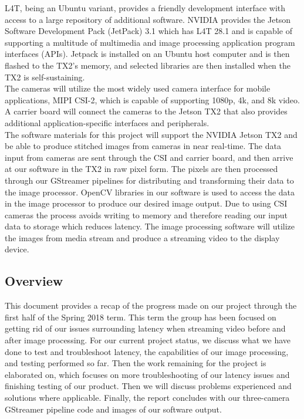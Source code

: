 \documentclass[letterpaper,10pt,serif,draftclsnofoot,onecolumn,compsoc,titlepage]{IEEEtran}
\begin{document}
L4T, being an Ubuntu variant, provides a friendly development interface with 
access to a large repository of additional software. NVIDIA provides the Jetson 
Software Development Pack (JetPack) 3.1 which has L4T 28.1 
and is capable of supporting a multitude of multimedia and image processing 
application program interfaces (APIs). Jetpack 
is installed on an Ubuntu host computer and is then flashed to the TX2's memory, and 
selected libraries are then installed when the TX2 is self-sustaining. \\

The cameras will utilize the most widely used camera interface for mobile applications, 
MIPI CSI-2, which is capable of supporting 1080p, 4k, and 8k video. 
A carrier board will connect the cameras to the Jetson TX2 that also provides 
additional application-specific interfaces and peripherals. \\

The software materials for this project will support the NVIDIA Jetson TX2 and 
be able to produce stitched images from cameras in near real-time. The data input 
from cameras are sent through the CSI and carrier board, and then arrive at our 
software in the TX2 in raw pixel form. The pixels are then processed through our 
GStreamer pipelines for distributing and transforming their data to the image 
processor. OpenCV libraries in our software is used to access the data in the image 
processor to produce our desired image output. Due to 
using CSI cameras the process avoids writing to memory and 
therefore reading our input data to storage which reduces latency. The image processing 
software will utilize the images from media stream and produce a streaming video 
to the display device.  \\

\subsection{Overview}

This document provides a recap of the progress made on our project through the first half
of the Spring 2018 term. This term the group has been focused on getting rid of our 
issues surrounding latency when streaming video before and after image processing. 
For our current project status, we discuss what we have done to test and troubleshoot 
latency, the capabilities of our image processing, and testing performed so far. 
Then the work remaining for the project is elaborated on, which focuses on more 
troubleshooting of our latency issues and finishing testing of our product. Then we will 
discuss problems experienced and solutions where applicable. Finally, the report concludes 
with our three-camera GStreamer pipeline code and images of our software output. \\
\end{document}
